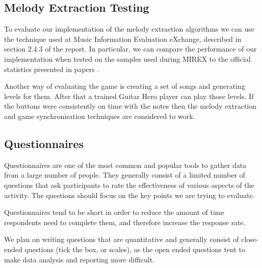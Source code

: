 \subsection{Melody Extraction Testing}
To evaluate our implementation of the melody extraction algorithms we can use the technique used at Music Information Evaluation eXchange, described in section 2.4.3 of the report. In particular, we can compare the performance of our implementation when tested on the samples used during MIREX to the official statistics presented in papers \cite{salamon, comparison}.

Another way of evaluating the game is creating a set of songs and generating levels for them. After that a trained Guitar Hero player can play those levels. If the buttons were consistently on time with the notes then the melody extraction and game synchronisation techniques are considered to work.

\subsection{Questionnaires}
Questionnaires are one of the most common and popular tools to gather data from a large number of people. They generally consist of a limited number of questions that ask participants to rate the effectiveness of various aspects of the activity. The questions should focus on the key points we are trying to evaluate. 

Questionnaires tend to be short in order to reduce the amount of time respondents need to complete them, and therefore increase the response rate. 

We plan on writing questions that are quantitative and generally consist of close-ended questions (tick the box, or scales), as the open ended questions tent to make data analysis and reporting more difficult.